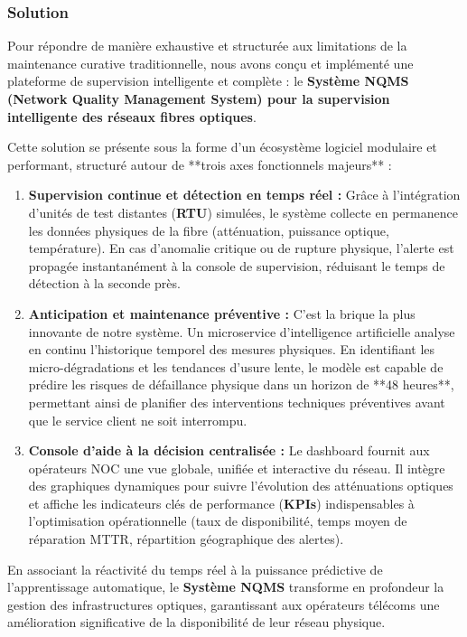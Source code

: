 \documentclass[11pt,a4paper]{article}
\begin{document}
\subsubsection{Solution}
Pour répondre de manière exhaustive et structurée aux limitations de la maintenance curative traditionnelle, nous avons conçu et implémenté une plateforme de supervision intelligente et complète : le \textbf{Système NQMS (Network Quality Management System) pour la supervision intelligente des réseaux fibres optiques}. 

Cette solution se présente sous la forme d'un écosystème logiciel modulaire et performant, structuré autour de **trois axes fonctionnels majeurs** :

\begin{enumerate}
    \item \textbf{Supervision continue et détection en temps réel :} Grâce à l'intégration d'unités de test distantes (\textbf{RTU}) simulées, le système collecte en permanence les données physiques de la fibre (atténuation, puissance optique, température). En cas d'anomalie critique ou de rupture physique, l'alerte est propagée instantanément à la console de supervision, réduisant le temps de détection à la seconde près.
    
    \item \textbf{Anticipation et maintenance préventive :} C'est la brique la plus innovante de notre système. Un microservice d'intelligence artificielle analyse en continu l'historique temporel des mesures physiques. En identifiant les micro-dégradations et les tendances d'usure lente, le modèle est capable de prédire les risques de défaillance physique dans un horizon de **48 heures**, permettant ainsi de planifier des interventions techniques préventives avant que le service client ne soit interrompu.
    
    \item \textbf{Console d'aide à la décision centralisée :} Le dashboard fournit aux opérateurs NOC une vue globale, unifiée et interactive du réseau. Il intègre des graphiques dynamiques pour suivre l'évolution des atténuations optiques et affiche les indicateurs clés de performance (\textbf{KPIs}) indispensables à l'optimisation opérationnelle (taux de disponibilité, temps moyen de réparation MTTR, répartition géographique des alertes).
\end{enumerate}

En associant la réactivité du temps réel à la puissance prédictive de l'apprentissage automatique, le \textbf{Système NQMS} transforme en profondeur la gestion des infrastructures optiques, garantissant aux opérateurs télécoms une amélioration significative de la disponibilité de leur réseau physique.
\end{document}
